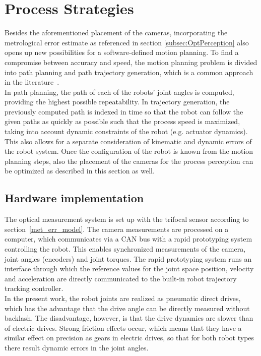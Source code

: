 \documentclass[5p,times,procedia]{elsarticle}
\begin{document}
\section{Process Strategies}
Besides the aforementioned placement of the cameras, incorporating the metrological error estimate as referenced in section \ref{subsec:OptPerception} also opens up new possibilities for a software-defined motion planning.
To find a compromise between accuracy and speed, the motion planning problem is divided into path planning and path trajectory generation, which is a common approach in the literature~\cite{Choset05}.\\
In path planning, the path of each of the robots' joint angles is computed, providing the highest possible repeatability.
In trajectory generation, the previously computed path is indexed in time so that the robot can follow the given paths as quickly as possible such that the process speed is maximized, taking into account dynamic constraints of the robot (e.g. actuator dynamics).
This also allows for a separate consideration of kinematic and dynamic errors of the robot system. 
Once the configuration of the robot is known from the motion planning steps, also the placement of the cameras for the process perception can be optimized as described in this section as well. 
%
\subsection{Hardware implementation}
The optical measurement system is set up with the trifocal sensor according to section~\ref{met_err_model}.
The camera measurements are processed on a computer, which communicates via a CAN bus with a rapid prototyping system controlling the robot.
This enables synchronized measurements of the camera, joint angles (encoders) and joint torques.
The rapid prototyping system runs an interface through which the reference values for the joint space position, velocity and acceleration are directly communicated to the built-in robot trajectory tracking controller.\\
In the present work, the robot joints are realized as pneumatic direct drives, which has the advantage that the drive angle can be directly measured without backlash. 
The disadvantage, however, is that the drive dynamics are slower than of electric drives. Strong friction effects occur, which means that they have a similar effect on precision as gears in electric drives, so that for both robot types there result dynamic errors in the joint angles. 
%
\end{document}
